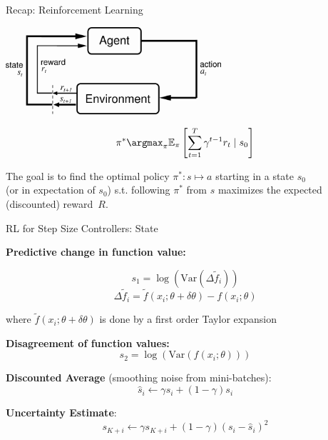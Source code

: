 \begin{frame}[c]{Recap: Reinforcement Learning }

\begin{center}
	\includegraphics[width=0.6\textwidth]{images/suttonbarto_rl.png}
\end{center}

\pause

\begin{eqnarray}
\pi^* \argmax_{\pi} \mathbb{E}_{\pi} \left[ \sum^{T}_{t=1} \gamma^{t-1} r_t \mid s_0 \right] \nonumber
\end{eqnarray}

The goal is to find the optimal policy $\pi^{*}: s \mapsto a$ starting in a state $s_0$\\ (or in expectation of $s_0$) s.t. following $\pi^{*}$ from $s$ maximizes the expected (discounted) reward~$R$.


\end{frame}
\begin{frame}[c]{RL for Step Size Controllers: State }

\textbf{Predictive change in function value:}

$$s_1 = \log \left( \text{Var}(\Delta \tilde{f}_i ) \right)$$
$$\Delta \tilde{f}_i = \tilde{f}(x_i; \theta + \delta \theta) - f(x_i; \theta)$$

where $\tilde{f}(x_i; \theta + \delta \theta)$ is done by a first order Taylor expansion

\pause
\textbf{Disagreement of function values:}
$$ s_2 = \log \left(\text{Var}(f(x_i; \theta)) \right)$$

\pause

\textbf{Discounted Average} (smoothing noise from mini-batches):
$$\hat{s}_i \leftarrow \gamma \hat{s_i} + (1 - \gamma) s_i$$

\pause

\textbf{Uncertainty Estimate}:
$$s_{K+i} \leftarrow \gamma s_{K+i} + (1-\gamma) (s_i - \hat{s}_i)^2$$


\end{frame}
